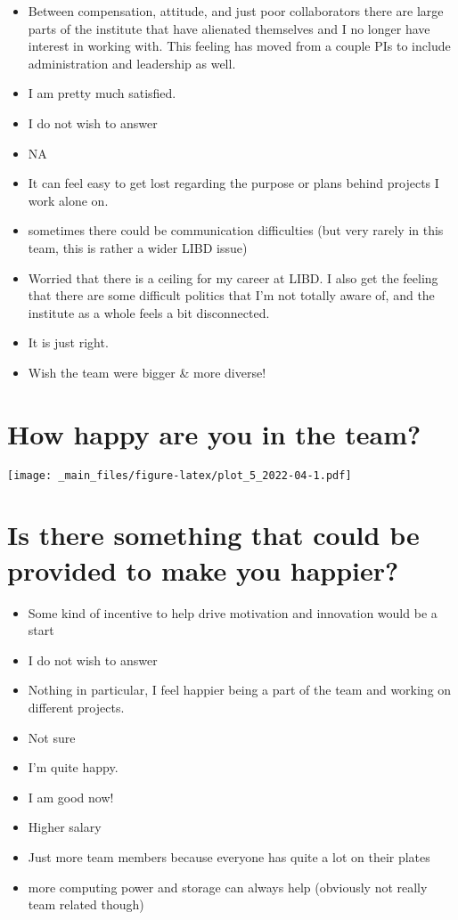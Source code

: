 \documentclass[
]{book}
\providecommand{\tightlist}{%
  \setlength{\itemsep}{0pt}\setlength{\parskip}{0pt}}
\begin{document}
\begin{itemize}
\tightlist
\item
  Between compensation, attitude, and just poor collaborators there are large parts of the institute that have alienated themselves and I no longer have interest in working with. This feeling has moved from a couple PIs to include administration and leadership as well.
\item
  I am pretty much satisfied.
\item
  I do not wish to answer
\item
  NA
\item
  It can feel easy to get lost regarding the purpose or plans behind projects I work alone on.
\item
  sometimes there could be communication difficulties (but very rarely in this team, this is rather a wider LIBD issue)
\item
  Worried that there is a ceiling for my career at LIBD. I also get the feeling that there are some difficult politics that I'm not totally aware of, and the institute as a whole feels a bit disconnected.
\item
  It is just right.
\item
  Wish the team were bigger \& more diverse!
\end{itemize}

\hypertarget{how-happy-are-you-in-the-team}{%
\section{How happy are you in the team?}\label{how-happy-are-you-in-the-team}}

\texttt{[image: \_main\_files/figure-latex/plot\_5\_2022-04-1.pdf]}

\hypertarget{is-there-something-that-could-be-provided-to-make-you-happier}{%
\section{Is there something that could be provided to make you happier?}\label{is-there-something-that-could-be-provided-to-make-you-happier}}

\begin{itemize}
\tightlist
\item
  Some kind of incentive to help drive motivation and innovation would be a start
\item
  I do not wish to answer
\item
  Nothing in particular, I feel happier being a part of the team and working on different projects.
\item
  Not sure
\item
  I'm quite happy.
\item
  I am good now!
\item
  Higher salary
\item
  Just more team members because everyone has quite a lot on their plates
\item
  more computing power and storage can always help (obviously not really team related though)
\end{itemize}
\end{document}
